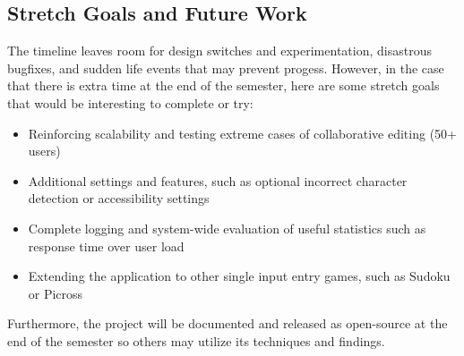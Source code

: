 \documentclass{article}
\begin{document}
\subsection{Stretch Goals and Future Work}
The timeline leaves room for design switches and experimentation, disastrous bugfixes, and sudden life events that
may prevent progess. However, in the case that there is extra time at the end of the semester, here are some stretch
goals that would be interesting to complete or try:
\begin{itemize}
    \item Reinforcing scalability and testing extreme cases of collaborative editing (50+ users)
    \item Additional settings and features, such as optional incorrect character detection or accessibility settings
    \item Complete logging and system-wide evaluation of useful statistics such as response time over user load
    \item Extending the application to other single input entry games, such as Sudoku or Picross
\end{itemize}

Furthermore, the project will be documented and released as open-source at the end of the semester so others may utilize its techniques and findings.

\newpage


\end{document}
